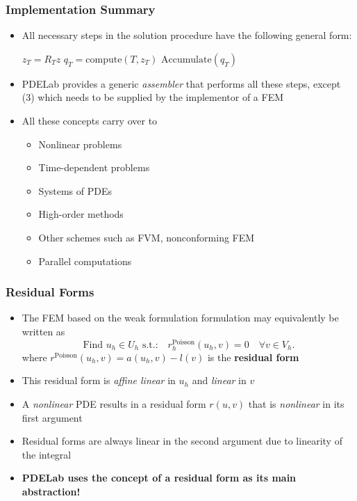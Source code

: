 \documentclass[ignorenonframetext,11pt]{beamer}
\theoremstyle{definition}
\begin{document}
\begin{frame}
\frametitle{Implementation Summary}
\begin{itemize}
\item All necessary steps in the solution procedure have the following general form:
\begin{algorithmic}[1]
 
\State $z_T = R_T z$ 
\State $q_T=\text{compute}(T,z_T)$ 
\State $\text{Accumulate}(q_T)$ 
\EndFor
\end{algorithmic}
\item PDELab provides a generic {\em assembler} that performs all these steps,
except (3) which needs to be supplied by the implementor of a FEM
\item All these concepts carry over to
\begin{itemize}
\item Nonlinear problems
\item Time-dependent problems
\item Systems of PDEs
\item High-order methods
\item Other schemes such as FVM, nonconforming FEM
\item Parallel computations
\end{itemize}
\end{itemize}
\end{frame}

\begin{frame}
\frametitle{Residual Forms}
\begin{itemize}
\item The FEM based on the weak formulation formulation may equivalently
be written as
\begin{equation*}
\text{Find $u_h\in U_h$ s.t.:} \quad r_h^\text{Poisson}(u_h,v)=0 \quad \forall v\in V_h.
\end{equation*}
where $r^\text{Poisson}(u_h,v) = a(u_h,v) - l(v)$ is the \textbf{residual form}
\item This residual form is {\em affine linear} in $u_h$ and {\em linear} in $v$
\item A {\em nonlinear} PDE results in a residual form $r(u,v)$ that is {\em nonlinear}
in its first argument
\item Residual forms are always linear in the second argument due
to linearity of the integral
\item \textbf{PDELab uses the concept of a residual form as its main abstraction!}
\end{itemize}
\end{frame}
\end{document}
